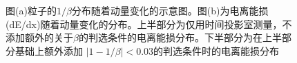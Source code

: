 \begin{figure}[htb]
\begin{subfigure}[b]{0.47\textwidth}
        \caption{}
        \label{fig:dEdxwithTOF}
    \end{subfigure}
       \caption[飞行时间探测器粒子鉴别表现]{图(a)粒子的$1/\beta$分布随着动量变化的示意图。图(b)为电离能损(dE/dx)随着动量变化的分布。上半部分为仅用时间投影室测量，不添加额外的关于$\beta$的判选条件的电离能损分布。下半部分为在上半部分基础上额外添加 $|1-1/\beta| < 0.03$的判选条件时的电离能损分布}
       \label{fig:TOFPerformance}
\end{figure}
  